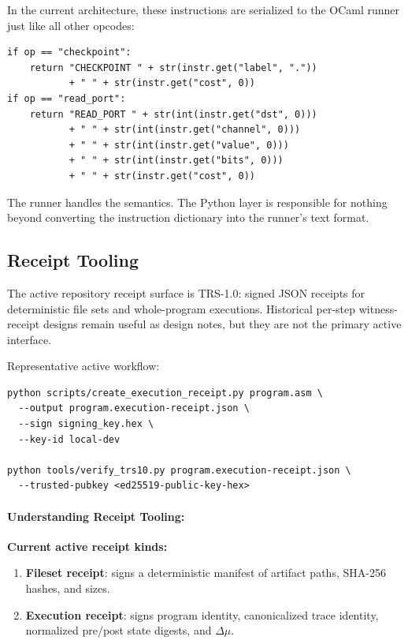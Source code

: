 In the current architecture, these instructions are serialized to the OCaml runner just like all other opcodes:
\begin{lstlisting}
if op == "checkpoint":
    return "CHECKPOINT " + str(instr.get("label", "."))
           + " " + str(instr.get("cost", 0))
if op == "read_port":
    return "READ_PORT " + str(int(instr.get("dst", 0)))
           + " " + str(int(instr.get("channel", 0)))
           + " " + str(int(instr.get("value", 0)))
           + " " + str(int(instr.get("bits", 0)))
           + " " + str(instr.get("cost", 0))
\end{lstlisting}

The runner handles the semantics. The Python layer is responsible for nothing beyond converting the instruction dictionary into the runner's text format.

\subsection{Receipt Tooling}

The active repository receipt surface is TRS-1.0: signed JSON receipts for deterministic file sets and whole-program executions. Historical per-step witness-receipt designs remain useful as design notes, but they are not the primary active interface.

Representative active workflow:
\begin{lstlisting}
python scripts/create_execution_receipt.py program.asm \
  --output program.execution-receipt.json \
  --sign signing_key.hex \
  --key-id local-dev

python tools/verify_trs10.py program.execution-receipt.json \
  --trusted-pubkey <ed25519-public-key-hex>
\end{lstlisting}

\paragraph{Understanding Receipt Tooling:}
\textbf{Current active receipt kinds:}
\begin{enumerate}
    \item \textbf{Fileset receipt}: signs a deterministic manifest of artifact paths, SHA-256 hashes, and sizes.
    \item \textbf{Execution receipt}: signs program identity, canonicalized trace identity, normalized pre/post state digests, and $\Delta\mu$.
\end{enumerate}

